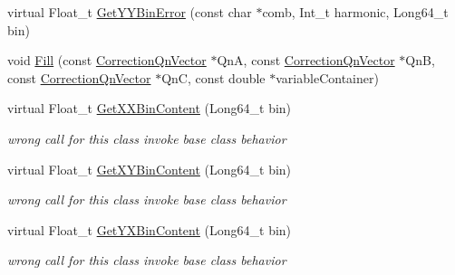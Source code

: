 \begin{DoxyCompactItemize}
\item 
virtual Float\+\_\+t \mbox{\hyperlink{classQn_1_1CorrectionProfile3DCorrelations_ad1727f73c8583d6efceaefb92f7698fa}{Get\+Y\+Y\+Bin\+Error}} (const char $\ast$comb, Int\+\_\+t harmonic, Long64\+\_\+t bin)
\item 
void \mbox{\hyperlink{classQn_1_1CorrectionProfile3DCorrelations_a0e3a3f2897838bfc0480ced2d0883e4e}{Fill}} (const \mbox{\hyperlink{classQn_1_1CorrectionQnVector}{Correction\+Qn\+Vector}} $\ast$QnA, const \mbox{\hyperlink{classQn_1_1CorrectionQnVector}{Correction\+Qn\+Vector}} $\ast$QnB, const \mbox{\hyperlink{classQn_1_1CorrectionQnVector}{Correction\+Qn\+Vector}} $\ast$QnC, const double $\ast$variable\+Container)
\item 
\mbox{\label{classQn_1_1CorrectionProfile3DCorrelations_a2c06b157700f9e1c8a11d15df6b4b816}} 
virtual Float\+\_\+t \mbox{\hyperlink{classQn_1_1CorrectionProfile3DCorrelations_a2c06b157700f9e1c8a11d15df6b4b816}{Get\+X\+X\+Bin\+Content}} (Long64\+\_\+t bin)
\begin{DoxyCompactList}\small\item\em wrong call for this class invoke base class behavior \end{DoxyCompactList}\item 
\mbox{\label{classQn_1_1CorrectionProfile3DCorrelations_a47c118a0603a6ca87c505f940e35249c}} 
virtual Float\+\_\+t \mbox{\hyperlink{classQn_1_1CorrectionProfile3DCorrelations_a47c118a0603a6ca87c505f940e35249c}{Get\+X\+Y\+Bin\+Content}} (Long64\+\_\+t bin)
\begin{DoxyCompactList}\small\item\em wrong call for this class invoke base class behavior \end{DoxyCompactList}\item 
\mbox{\label{classQn_1_1CorrectionProfile3DCorrelations_a779657f7aabd240f26fae0690a5b24a7}} 
virtual Float\+\_\+t \mbox{\hyperlink{classQn_1_1CorrectionProfile3DCorrelations_a779657f7aabd240f26fae0690a5b24a7}{Get\+Y\+X\+Bin\+Content}} (Long64\+\_\+t bin)
\begin{DoxyCompactList}\small\item\em wrong call for this class invoke base class behavior \end{DoxyCompactList}\item 

\end{DoxyCompactItemize}
